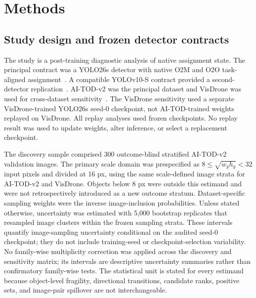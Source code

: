 \section{Methods}

\subsection{Study design and frozen detector contracts}

The study is a post-training diagnostic analysis of native assignment state. The principal contract was a YOLO26s detector with native O2M and O2O task-aligned assignment~\cite{jocher2026yolo26}. A compatible YOLOv10-S contract provided a second-detector replication~\cite{wang2024yolov10}. AI-TOD-v2 was the principal dataset and VisDrone was used for cross-dataset sensitivity~\cite{xu2022aitodv2,zhu2018visdrone}. The VisDrone sensitivity used a separate VisDrone-trained YOLO26s seed-0 checkpoint, not AI-TOD-trained weights replayed on VisDrone. All replay analyses used frozen checkpoints. No replay result was used to update weights, alter inference, or select a replacement checkpoint.

The discovery sample comprised 300 outcome-blind stratified AI-TOD-v2 validation images. The primary scale domain was prespecified as $8\leq\sqrt{w_gh_g}<32$ input pixels and divided at 16 px, using the same scale-defined image strata for AI-TOD-v2 and VisDrone. Objects below 8 px were outside this estimand and were not retrospectively introduced as a new outcome stratum. Dataset-specific sampling weights were the inverse image-inclusion probabilities. Unless stated otherwise, uncertainty was estimated with 5,000 bootstrap replicates that resampled image clusters within the frozen sampling strata. These intervals quantify image-sampling uncertainty conditional on the audited seed-0 checkpoint; they do not include training-seed or checkpoint-selection variability. No family-wise multiplicity correction was applied across the discovery and sensitivity matrix; its intervals are descriptive uncertainty summaries rather than confirmatory family-wise tests. The statistical unit is stated for every estimand because object-level fragility, directional transitions, candidate ranks, positive sets, and image-pair spillover are not interchangeable.

